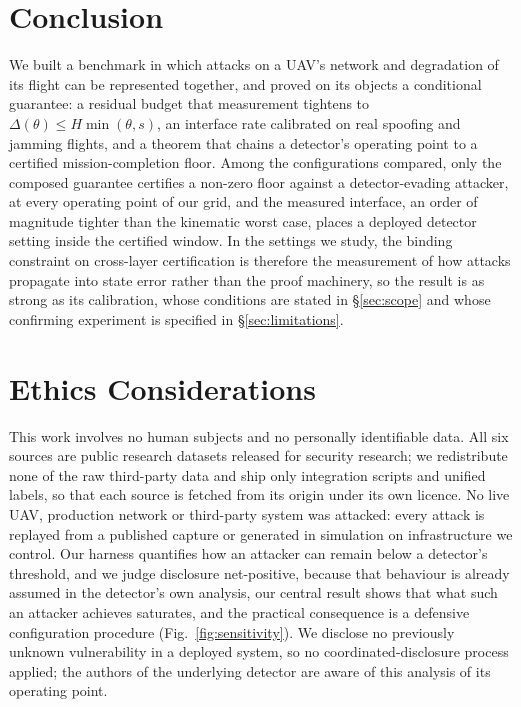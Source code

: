\documentclass[conference,letterpaper,10pt]{IEEEtran}   %
\begin{document}
\section{Conclusion}
\label{sec:conclusion}
We built a benchmark in which attacks on a UAV's network and degradation of its
flight can be represented together, and proved on its objects a conditional
guarantee: a residual budget that measurement tightens to
$\Delta(\theta)\le H\min(\theta,s)$, an interface rate calibrated on real
spoofing and jamming flights, and a theorem that chains a detector's operating
point to a certified mission-completion floor. Among the configurations
compared, only the composed guarantee certifies a non-zero floor against a
detector-evading attacker, at every operating point of our grid, and the
measured interface, an order of magnitude tighter than the kinematic worst case,
places a deployed detector setting inside the certified window. In the settings
we study, the binding constraint on cross-layer certification is therefore the
measurement of how attacks
propagate into state error rather than the proof machinery, so the result is as
strong as its calibration, whose conditions are stated in \S\ref{sec:scope}
and whose confirming experiment is specified in \S\ref{sec:limitations}.

\section{Ethics Considerations}
\label{sec:ethics}
This work involves no human subjects and no personally identifiable data. All
six sources are public research datasets released for security research; we
redistribute none of the raw third-party data and ship only integration scripts
and unified labels, so that each source is fetched from its origin under its own
licence. No live UAV, production network or third-party system was
attacked: every attack is replayed from a published capture or generated in
simulation on infrastructure we control. Our harness quantifies how an attacker
can remain below a detector's threshold, and we judge disclosure net-positive,
because that behaviour is already assumed in the detector's own analysis, our
central result shows that what such an attacker achieves saturates, and the
practical consequence is a defensive configuration procedure
(Fig.~\ref{fig:sensitivity}). We disclose no previously unknown vulnerability
in a deployed system, so no coordinated-disclosure process applied; the authors
of the underlying detector are aware of this analysis of its operating point.
\end{document}
